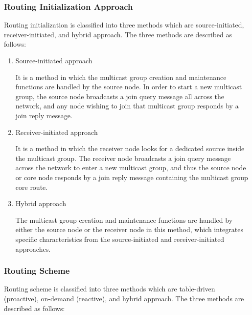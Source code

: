\subsubsection{Routing Initialization Approach}
Routing initialization is classified into three methods which are source-initiated, receiver-initiated, and hybrid approach. The three methods are described as follows:

\begin{enumerate}
\item Source-initiated approach

It is a method in which the multicast group creation and maintenance functions are handled by the source node. In order to start a new multicast group, the source node broadcasts a join query message all across the network, and any node wishing to join that multicast group responds by a join reply message. 

\item Receiver-initiated approach

It is a method in which the receiver node looks for a dedicated source inside the multicast group. The receiver node broadcasts a join query message across the network to enter a new multicast group, and thus the source node or core node responds by a join reply message containing the multicast group core route. 

\item Hybrid approach

The multicast group creation and maintenance functions are handled by either the source node or the receiver node in this method, which integrates specific characteristics from the source-initiated and receiver-initiated approaches. 
 
\end{enumerate}

\subsubsection{Routing Scheme}
Routing scheme is classified into three methods which are table-driven (proactive), on-demand (reactive), and hybrid approach. The three methods are described as follows:

